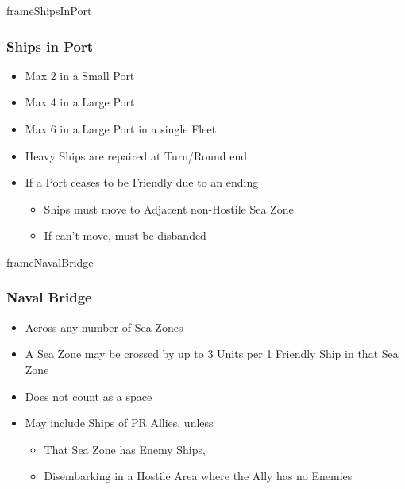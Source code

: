 \documentclass[10pt]{article}
\newlength{\fhShipsInPort} \setlength\fhShipsInPort{11\baselineskip}
\newlength{\fhNavalBridge} \setlength\fhNavalBridge{9\baselineskip}
\begin{document}
\begin{dynamiccontents*}{frameShipsInPort}\begin{eubox}{\fhShipsInPort}
	\subsubsection*{Ships in Port }
	\begin{itemize}
		\item Max 2 in a Small Port
		\item Max 4 in a Large Port
		\item Max 6 in a Large Port in a single Fleet
		\item Heavy Ships are repaired at Turn/Round end
		\item If a Port ceases to be Friendly due to an ending \alliance
		\begin{itemize}
			\item Ships must move to Adjacent non-Hostile Sea Zone
			\item If can't move, must be disbanded 
		\end{itemize}
	\end{itemize}
\end{eubox}\end{dynamiccontents*}

\begin{dynamiccontents*}{frameNavalBridge}\begin{eubox}{\fhNavalBridge}
	\subsubsection*{Naval Bridge }
	\begin{itemize}
		\item Across any number of Sea Zones
		\item A Sea Zone may be crossed by up to 3 Units per 1 Friendly Ship in that Sea Zone
		\item Does not count as a space
		\item May include Ships of PR Allies, unless
		\begin{itemize}
			\item That Sea Zone has Enemy Ships, 
			\item Disembarking in a Hostile Area where the Ally has no Enemies
		\end{itemize}
	\end{itemize}
\end{eubox}\end{dynamiccontents*}
\end{document}

